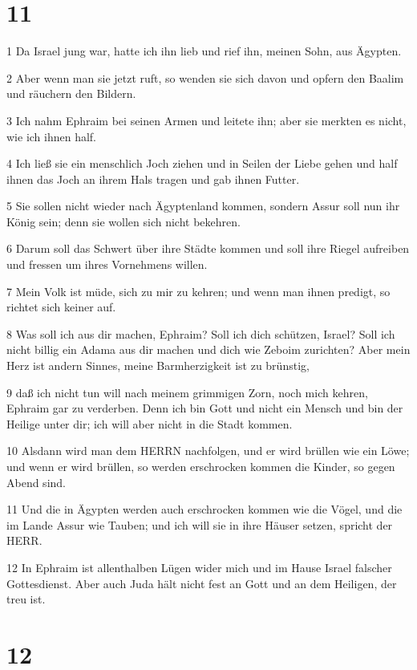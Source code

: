 \chapter{11}

\par 1 Da Israel jung war, hatte ich ihn lieb und rief ihn, meinen Sohn, aus Ägypten.
\par 2 Aber wenn man sie jetzt ruft, so wenden sie sich davon und opfern den Baalim und räuchern den Bildern.
\par 3 Ich nahm Ephraim bei seinen Armen und leitete ihn; aber sie merkten es nicht, wie ich ihnen half.
\par 4 Ich ließ sie ein menschlich Joch ziehen und in Seilen der Liebe gehen und half ihnen das Joch an ihrem Hals tragen und gab ihnen Futter.
\par 5 Sie sollen nicht wieder nach Ägyptenland kommen, sondern Assur soll nun ihr König sein; denn sie wollen sich nicht bekehren.
\par 6 Darum soll das Schwert über ihre Städte kommen und soll ihre Riegel aufreiben und fressen um ihres Vornehmens willen.
\par 7 Mein Volk ist müde, sich zu mir zu kehren; und wenn man ihnen predigt, so richtet sich keiner auf.
\par 8 Was soll ich aus dir machen, Ephraim? Soll ich dich schützen, Israel? Soll ich nicht billig ein Adama aus dir machen und dich wie Zeboim zurichten? Aber mein Herz ist andern Sinnes, meine Barmherzigkeit ist zu brünstig,
\par 9 daß ich nicht tun will nach meinem grimmigen Zorn, noch mich kehren, Ephraim gar zu verderben. Denn ich bin Gott und nicht ein Mensch und bin der Heilige unter dir; ich will aber nicht in die Stadt kommen.
\par 10 Alsdann wird man dem HERRN nachfolgen, und er wird brüllen wie ein Löwe; und wenn er wird brüllen, so werden erschrocken kommen die Kinder, so gegen Abend sind.
\par 11 Und die in Ägypten werden auch erschrocken kommen wie die Vögel, und die im Lande Assur wie Tauben; und ich will sie in ihre Häuser setzen, spricht der HERR.
\par 12 In Ephraim ist allenthalben Lügen wider mich und im Hause Israel falscher Gottesdienst. Aber auch Juda hält nicht fest an Gott und an dem Heiligen, der treu ist.

\chapter{12}

